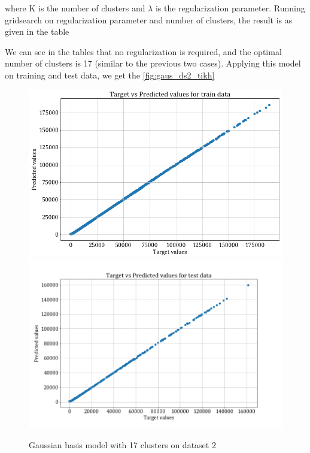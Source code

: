 \documentclass[12pt,a4paper]{article}
\newcommand{\noi}{\noindent}
\begin{document}
where K is the number of clusters and $\lambda$ is the regularization parameter. 
Running gridsearch on regularization parameter and number of clusters, the result is as given in the table 


\noi
We can see in the tables that no regularization is required, and the optimal number of clusters is 17 (similar to the previous two cases).
Applying this model on training and test data, we get the \autoref{fig:gaus_ds2_tikh}
\begin{figure}
    \centering
    \includegraphics[scale=0.25]{images/train_ds2_tikhreg.png}
    \includegraphics[scale=0.25]{images/test_ds2_tikhreg.png}
    \caption{Gaussian basis model with 17 clusters on dataset 2}
    \label{fig:gaus_ds2_tikh}
\end{figure}
\end{document}
